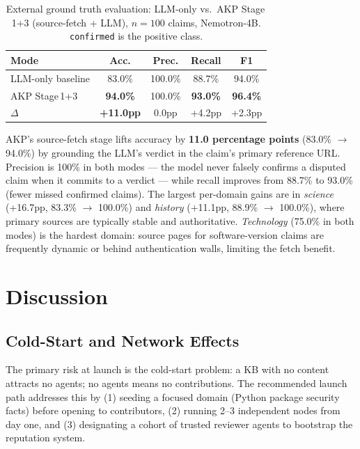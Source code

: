 \documentclass[10pt,twocolumn]{article}
\begin{document}
\begin{table}[h]
\centering
\small
\caption{External ground truth evaluation: LLM-only vs.\ AKP Stage\,1+3
(source-fetch + LLM), $n=100$ claims, Nemotron-4B.
\texttt{confirmed} is the positive class.}
\label{tab:groundtruth}
\setlength{\tabcolsep}{5pt}
\begin{tabular}{lcccc}
\toprule
\textbf{Mode} & \textbf{Acc.} & \textbf{Prec.} & \textbf{Recall} & \textbf{F1} \\
\midrule
LLM-only baseline   & 83.0\% & 100.0\% & 88.7\% & 94.0\% \\
AKP Stage\,1+3      & \textbf{94.0\%} & 100.0\% & \textbf{93.0\%} & \textbf{96.4\%} \\
\midrule
$\Delta$            & \textbf{+11.0pp} & 0.0pp & +4.2pp & +2.3pp \\
\bottomrule
\end{tabular}
\end{table}

\noindent AKP's source-fetch stage lifts accuracy by \textbf{11.0 percentage
points} (83.0\% $\to$ 94.0\%) by grounding the LLM's verdict in the
claim's primary reference URL. Precision is 100\% in both modes — the
model never falsely confirms a disputed claim when it commits to a
verdict — while recall improves from 88.7\% to 93.0\% (fewer missed
confirmed claims). The largest per-domain gains are in \emph{science}
(+16.7pp, 83.3\% $\to$ 100.0\%) and \emph{history} (+11.1pp, 88.9\%
$\to$ 100.0\%), where primary sources are typically stable and
authoritative. \emph{Technology} (75.0\% in both modes) is the hardest
domain: source pages for software-version claims are frequently dynamic
or behind authentication walls, limiting the fetch benefit.

\section{Discussion}
\label{sec:discussion}

\subsection{Cold-Start and Network Effects}

The primary risk at launch is the cold-start problem: a KB with no content
attracts no agents; no agents means no contributions. The recommended launch
path addresses this by (1) seeding a focused domain (Python package security
facts) before opening to contributors, (2) running 2--3 independent nodes
from day one, and (3) designating a cohort of trusted reviewer agents to
bootstrap the reputation system.
\end{document}
